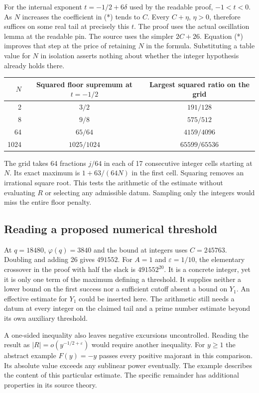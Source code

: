 \documentclass[12pt,letterpaper]{article}
\begin{document}
For the internal exponent $t=-1/2+6\delta$ used by the readable proof, $-1<t<0$. As $N$ increases the coefficient in (*) tends to $C$. Every $C+\eta$, $\eta>0$, therefore suffices on some real tail at precisely this $t$. The proof uses the actual oscillation lemma at the readable pin. The source uses the simpler $2C+26$. Equation (*) improves that step at the price of retaining $N$ in the formula. Substituting a table value for $N$ in isolation asserts nothing about whether the integer hypothesis already holds there.

\begin{center}\small\begin{tabular}{@{}rcc@{}}\toprule
$N$ & Squared floor supremum at $t=-1/2$ & Largest squared ratio on the grid\\\midrule
2 & $3/2$ & $191/128$\\
8 & $9/8$ & $575/512$\\
64 & $65/64$ & $4159/4096$\\
1024 & $1025/1024$ & $65599/65536$\\\bottomrule\end{tabular}\end{center}
The grid takes 64 fractions $j/64$ in each of 17 consecutive integer cells starting at $N$. Its exact maximum is $1+63/(64N)$ in the first cell. Squaring removes an irrational square root. This tests the arithmetic of the estimate without evaluating $R$ or selecting any admissible datum. Sampling only the integers would miss the entire floor penalty.

\subsection{Reading a proposed numerical threshold}
At $q=18480$, $\varphi(q)=3840$ and the bound at integers uses $C=245763$. Doubling and adding 26 gives $491552$. For $A=1$ and $\varepsilon=1/10$, the elementary crossover in the proof with half the slack is $491552^{20}$. It is a concrete integer, yet it is only one term of the maximum defining a threshold. It supplies neither a lower bound on the first success nor a sufficient cutoff absent a bound on $Y_1$. An effective estimate for $Y_1$ could be inserted here. The arithmetic still needs a datum at every integer on the claimed tail and a prime number estimate beyond its own auxiliary threshold.

A one-sided inequality also leaves negative excursions uncontrolled. Reading the result as $|R|=o(y^{-1/2+\varepsilon})$ would require another inequality. For $y\ge1$ the abstract example $F(y)=-y$ passes every positive majorant in this comparison. Its absolute value exceeds any sublinear power eventually. The example describes the content of this particular estimate. The specific remainder has additional properties in its source theory.
\end{document}
